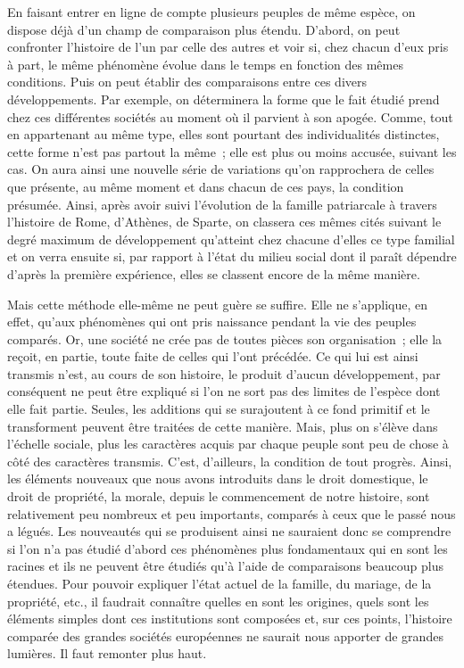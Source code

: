 \documentclass[french,twoside]{book} %
\begin{document}
En faisant entrer en ligne de compte plusieurs peuples de même espèce, on dispose déjà d’un champ de comparaison plus étendu. D’abord, on peut confronter l’histoire de l’un par celle des autres et voir si, chez chacun d’eux pris à part, le même phénomène évolue dans le temps en fonction des mêmes conditions. Puis on peut établir des comparaisons entre ces divers développements. Par exemple, on déterminera la forme que le fait étudié prend chez ces différentes sociétés au moment où il parvient à son apogée. Comme, tout en appartenant au même type, elles sont pourtant des individualités distinctes, cette forme n’est pas partout la même ; elle est plus ou moins accusée, suivant les cas. On aura ainsi une nouvelle série de variations qu’on rapprochera de celles que présente, au même moment et dans chacun de ces pays, la condition présumée. Ainsi, après avoir suivi l’évolution de la famille patriarcale à travers l’histoire de Rome, d’Athènes, de Sparte, on classera ces mêmes cités suivant le degré maximum de développement qu’atteint chez chacune d’elles ce type familial et on verra ensuite si, par rapport à l’état du milieu social dont il paraît dépendre d’après la première expérience, elles se classent encore de la même manière.\par
Mais cette méthode elle-même ne peut guère se suffire. Elle ne s’applique, en effet, qu’aux phénomènes qui ont pris naissance pendant la vie des peuples comparés. Or, une société ne crée pas de toutes pièces son organisation ; elle la reçoit, en partie, toute faite de celles qui l’ont précédée. Ce qui lui est ainsi transmis n’est, au cours de son histoire, le produit d’aucun développement, par conséquent ne peut être expliqué si l’on ne sort pas des limites de l’espèce dont elle fait partie. Seules, les additions qui se surajoutent à ce fond primitif et le transforment peuvent être traitées de cette manière. Mais, plus on s’élève dans l’échelle sociale, plus les caractères acquis par chaque peuple sont peu de chose à côté des caractères transmis. C’est, d’ailleurs, la condition de tout progrès. Ainsi, les éléments nouveaux que nous avons introduits dans le droit domestique, le droit de propriété, la morale, depuis le commencement de notre histoire, sont relativement peu nombreux et peu importants, comparés à ceux que le passé nous a légués. Les nouveautés qui se produisent ainsi ne sauraient donc se comprendre si l’on n’a pas étudié d’abord ces phénomènes plus fondamentaux qui en sont les racines et ils ne peuvent être étudiés qu’à l’aide de comparaisons beaucoup plus étendues. Pour pouvoir expliquer l’état actuel de la famille, du mariage, de la propriété, etc., il faudrait connaître quelles en sont les origines, quels sont les éléments simples dont ces institutions sont composées et, sur ces points, l’histoire comparée des grandes sociétés européennes ne saurait nous apporter de grandes lumières. Il faut remonter plus haut.\par
\end{document}

